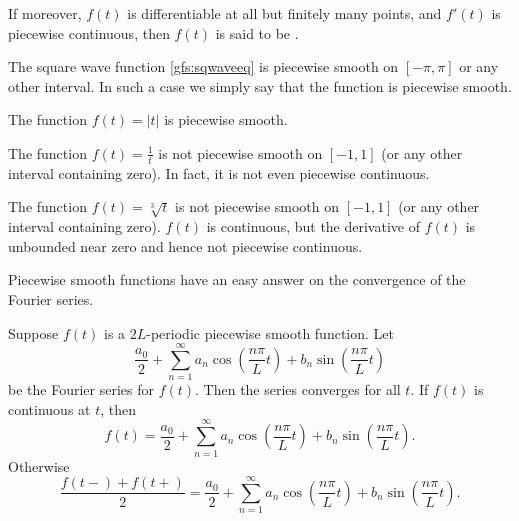 If moreover, $f(t)$ is differentiable at all but finitely many points,
and $f'(t)$ is piecewise continuous, then 
$f(t)$ is said to be \emph{}.

\begin{example}
The square wave function \eqref{gfs:sqwaveeq}
is piecewise smooth on $[-\pi,\pi]$ or any other interval.  In such a
case we simply say that the function is piecewise smooth.
\end{example}

\begin{example}
The function $f(t) = \lvert t \lvert$
is piecewise smooth.
\end{example}

\begin{example}
The function $f(t) = \frac{1}{t}$ is not piecewise smooth on
$[-1,1]$ (or any other interval containing zero).  In fact, it is not
even piecewise continuous.
\end{example}

\begin{example}
The function $f(t) = \sqrt[3]{t}$ is not piecewise smooth on
$[-1,1]$ (or any other interval containing zero).  $f(t)$ is continuous, but
the derivative of $f(t)$ is unbounded near zero and hence not piecewise
continuous.
\end{example}

Piecewise smooth functions have an easy answer on the convergence
of the Fourier series.

\begin{theorem}
Suppose $f(t)$ is a $2L$-periodic piecewise smooth function.
Let
\begin{equation*}
\frac{a_0}{2} + \sum_{n=1}^\infty a_n \cos \left( \frac{n \pi}{L} t
\right)
+ b_n \sin \left( \frac{n \pi}{L} t \right)
\end{equation*}
be the Fourier series for $f(t)$.  Then the series converges
for all $t$.  If $f(t)$ is continuous
at $t$, then
\begin{equation*}
f(t) = \frac{a_0}{2} + \sum_{n=1}^\infty
a_n \cos \left( \frac{n \pi}{L} t \right)
+ b_n \sin \left( \frac{n \pi}{L} t \right) .
\end{equation*}
Otherwise
\begin{equation*}
\frac{f(t-)+f(t+)}{2} =
\frac{a_0}{2} + \sum_{n=1}^\infty a_n \cos \left( \frac{n \pi}{L}  t
\right)
+ b_n \sin \left( \frac{n \pi}{L} t \right) .
\end{equation*}
\end{theorem}

